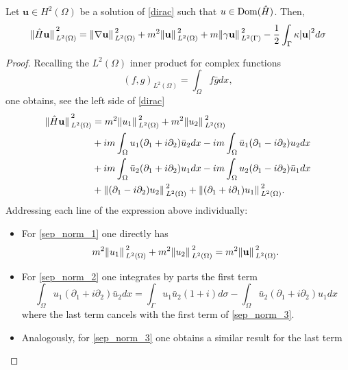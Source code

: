 \begin{lemma}\label{lemma_sep_norm}
    Let \(\mathbf{u} \in H^2(\Omega)\) be a solution of \eqref{dirac} such that \(u \in \operatorname{Dom}(\hat{H})\). Then,
    \begin{equation}\label{sep_norm}
        \norm*{\hat{H}\mathbf{u}}_{L^2(\Omega)}^2 = \norm*{\nabla \mathbf{u} }_{L^2(\Omega)}^2 + m^2 \norm*{\mathbf{u}}_{L^2(\Omega)}^2 + m \norm*{\gamma \mathbf{u}}_{L^2(\Gamma)}^2 -\frac{1}{2}\int_{\Gamma}\kappa \abs{\mathbf{u}}^2 d\sigma
    \end{equation}
\end{lemma}
\begin{proof}
    Recalling the \(L^2(\Omega)\) inner product for complex functions
    \[
    (f, g)_{L^2(\Omega)} = \int_\Omega f \bar{g} dx,
    \]
    one obtains, see the left side of \eqref{dirac}
    \begin{align}
        \norm*{\hat{H}\mathbf{u}}_{L^2(\Omega)}^2 &= m^2 \norm*{u_1}_{L^2(\Omega)}^2 + m^2 \norm*{u_2}_{L^2(\Omega)}^2 \label{sep_norm_1}\\ 
        & + i m \int_\Omega u_1(\partial_1 + i \partial_2)\bar{u}_2dx - i m \int_\Omega \bar{u}_1(\partial_1 - i \partial_2)u_2 dx \label{sep_norm_2}\\ 
        & + i m \int_\Omega \bar{u}_2(\partial_1 + i \partial_2)u_1 dx - i m \int_\Omega u_2(\partial_1 - i \partial_2)\bar{u}_1 dx \label{sep_norm_3}\\ 
        & +\norm*{(\partial_1 - i \partial_2)u_2}_{L^2(\Omega)}^2 + \norm*{(\partial_1 + i \partial_1)u_1}_{L^2(\Omega)}^2. \label{sep_norm_4}
    \end{align}
    Addressing each line of the expression above individually:
    \begin{itemize}
        \item For \eqref{sep_norm_1} one directly has
                \[
                    m^2 \norm*{u_1}_{L^2(\Omega)}^2 + m^2 \norm*{u_2}_{L^2(\Omega)}^2 = m^2 \norm*{\mathbf{u}}_{L^2(\Omega)}^2.
                \]
        \item For \eqref{sep_norm_2} one integrates by parts the first term
                \[
                \int_\Omega u_1(\partial_1 + i \partial_2)\bar{u}_2dx = \int_{\Gamma} u_1\bar{u}_2(1+i)d\sigma - \int_\Omega \bar{u}_2(\partial_1 + i \partial_2)u_1dx
                \]
            where the last term cancels with the first term of \eqref{sep_norm_3}.
        \item Analogously, for \eqref{sep_norm_3} one obtains a similar result for the last term

\end{itemize}
\end{proof}
